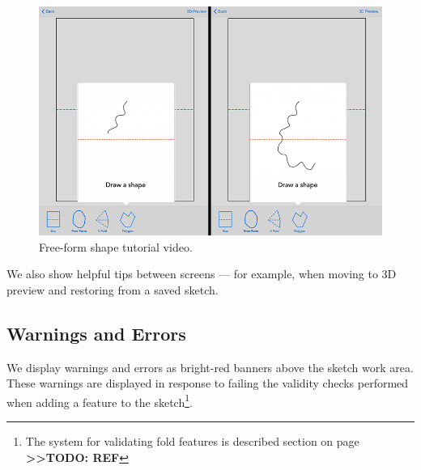 \begin{figure}[htbp]
\centering
\includegraphics{figures/32_UI_Tool_Interactions/tutorial_step_one_two.png}
\caption{Free-form shape tutorial video.}
\end{figure}

We also show helpful tips between screens --- for example, when moving
to 3D preview and restoring from a saved sketch.

\subsection{Warnings and Errors}\label{warnings-and-errors}

We display warnings and errors as bright-red banners above the sketch
work area. These warnings are displayed in response to failing the
validity checks performed when adding a feature to the sketch\footnote{The
  system for validating fold features is described section on page
  \textbf{\textgreater{}\textgreater{}TODO: REF}}.

